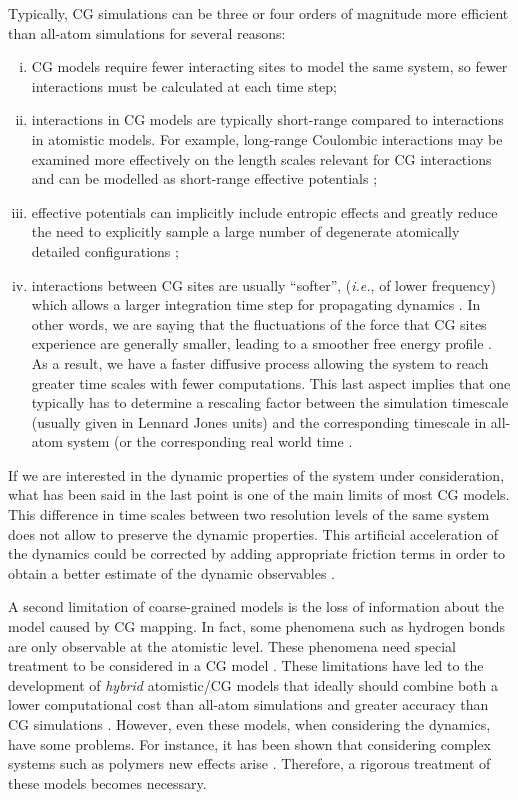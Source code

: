 \documentclass[10pt,a4paper]{book}
\theoremstyle{definition}
\begin{document}
Typically, CG simulations can be three or four orders of magnitude more efficient than all-atom simulations for several reasons:
\begin{enumerate}[(i)]
\item CG models require fewer interacting sites to model the same system, so fewer interactions must be calculated at each time step;
\item interactions in CG models are typically short-range compared to interactions in atomistic models. For example, long-range Coulombic interactions may be examined more effectively on the length scales relevant for CG interactions and can be modelled as short-range effective potentials \cite{Noid2013Book,Silbermann2006};
\item effective potentials can implicitly include entropic effects and greatly reduce the need to explicitly sample a large number of degenerate atomically detailed configurations \cite{Levitt1975};
\item interactions between CG sites are usually ``softer'', (\textit{i.e.}, of lower frequency) which allows a larger integration time step for propagating dynamics \cite{Marrink2004}. In other words, we are saying that the fluctuations of the force that CG sites experience are generally smaller, leading to a smoother free energy profile \cite{Rudzinski2019}. As a result, we have a faster diffusive process allowing the system to reach greater time scales with fewer computations. This last aspect implies that one typically has to determine a rescaling factor between the simulation timescale (usually given in Lennard Jones units) and the corresponding timescale in all-atom system (or the corresponding real world time \cite{Fritz2011,Potestio2014}.
\end{enumerate}

If we are interested in the dynamic properties of the system under consideration, what has been said in the last point is one of the main limits of most CG models. This difference in time scales between two resolution levels of the same system does not allow to preserve the dynamic properties. This artificial acceleration of the dynamics could be corrected by adding appropriate friction terms in order to obtain a better estimate of the dynamic observables \cite{Izvekov2006}. 

A second limitation of coarse-grained models is the loss of information about the model caused by CG mapping. In fact, some phenomena such as hydrogen bonds are only observable at the atomistic level. These phenomena need special treatment to be considered in a CG model \cite{Karimi-Varzaneh2008}. These limitations have led to the development of \emph{hybrid} atomistic/CG models that ideally should combine both a lower computational cost than all-atom simulations and greater accuracy than CG simulations \cite{DiPasquale2012,Rzepiela2011}.
However, even these models, when considering the dynamics, have some problems. For instance, it has been shown that considering complex systems such as polymers new effects arise \cite{DiPasquale2017}. Therefore, a rigorous treatment of these models becomes necessary.
\end{document}
